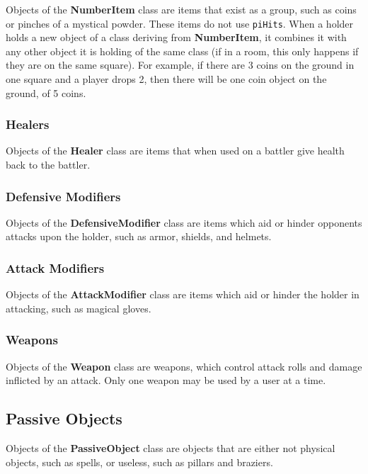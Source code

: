 \documentclass[12pt]{article}
\newcommand{\class}[1]{\textbf{#1}}
\newcommand{\prop}[1]{\texttt{#1}}
\begin{document}
Objects of the \class{NumberItem} class are items that exist as a
group, such as coins or pinches of a mystical powder.  These items do
not use \prop{piHits}.  When a holder holds a new object of a class
deriving from  \class{NumberItem}, it combines it with any other
object it is holding of the same class (if in a room, this only
happens if they are on the same square).  For example, if there are 3 coins on
the ground in one square and a player drops 2, then there will be one
coin object on the ground, of 5 coins.

\subsubsection{Healers}

Objects of the \class{Healer} class are items that when used on a
battler give health back to the battler.

\subsubsection{Defensive Modifiers}

Objects of the \class{DefensiveModifier} class are items which aid or
hinder opponents attacks upon the holder, such as armor, shields, and
helmets.

\subsubsection{Attack Modifiers}

Objects of the \class{AttackModifier} class are items which aid or
hinder the holder in attacking, such as magical gloves.

\subsubsection{Weapons}

Objects of the \class{Weapon} class are weapons, which control attack
rolls and damage inflicted by an attack.  Only one weapon may be used
by a user at a time.

\subsection{Passive Objects}

Objects of the \class{PassiveObject} class are objects that are either
not physical objects, such as spells, or useless, such as pillars and braziers.
\end{document}
